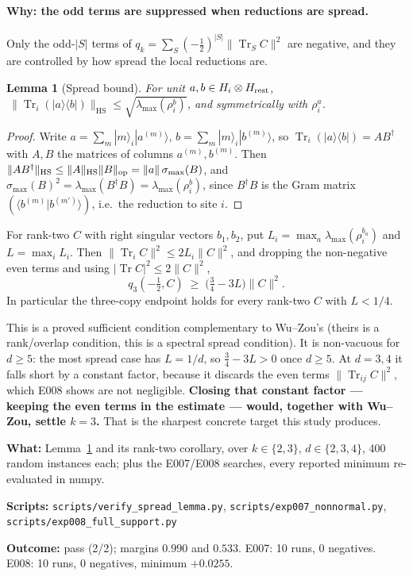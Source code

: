 \documentclass[11pt]{article}
\theoremstyle{definition}
\theoremstyle{plain}
\newtheorem{lemma}{Lemma}
\newcommand{\HS}{\mathrm{HS}}
\newcommand{\Tr}{\operatorname{Tr}}
\begin{document}
\paragraph{Why: the odd terms are suppressed when reductions are spread.} Only the
odd-$|S|$ terms of $q_k=\sum_S(-\tfrac12)^{|S|}\|\Tr_SC\|^2$ are negative, and they are
controlled by how spread the local reductions are.

\begin{lemma}[Spread bound]
\label{lem:spread}
For unit $a,b\in H_i\otimes H_{\rm rest}$,
$\ \|\Tr_i(|a\rangle\langle b|)\|_\HS\le\sqrt{\lambda_{\max}(\rho^b_i)}$, and symmetrically
with $\rho^a_i$.
\end{lemma}
\begin{proof}
Write $a=\sum_m|m\rangle_i|a^{(m)}\rangle$, $b=\sum_m|m\rangle_i|b^{(m)}\rangle$, so
$\Tr_i(|a\rangle\langle b|)=AB^\dagger$ with $A,B$ the matrices of columns $a^{(m)},b^{(m)}$.
Then $\|AB^\dagger\|_\HS\le\|A\|_\HS\|B\|_{\rm op}=\|a\|\,\sigma_{\max}(B)$, and
$\sigma_{\max}(B)^2=\lambda_{\max}(B^\dagger B)=\lambda_{\max}(\rho^b_i)$, since $B^\dagger B$
is the Gram matrix $(\langle b^{(m)}|b^{(m')}\rangle)$, i.e.\ the reduction to site $i$.
\end{proof}

\begin{corollary}
For rank-two $C$ with right singular vectors $b_1,b_2$, put
$L_i=\max_a\lambda_{\max}(\rho^{b_a}_i)$ and $L=\max_iL_i$. Then
$\|\Tr_iC\|^2\le2L_i\|C\|^2$, and dropping the non-negative even terms and using
$|\Tr C|^2\le2\|C\|^2$,
\[
q_3(-\tfrac12,C)\;\ge\;\Big(\tfrac34-3L\Big)\|C\|^2 .
\]
In particular the three-copy endpoint holds for every rank-two $C$ with $L<1/4$.
\end{corollary}

This is a proved sufficient condition complementary to Wu--Zou's (theirs is a rank/overlap
condition, this is a spectral spread condition). It is non-vacuous for $d\ge5$: the most
spread case has $L=1/d$, so $\tfrac34-3L>0$ once $d\ge5$. At $d=3,4$ it falls short by a
constant factor, because it discards the even terms $\|\Tr_{ij}C\|^2$, which E008 shows are
not negligible. \textbf{Closing that constant factor --- keeping the even terms in the
estimate --- would, together with Wu--Zou, settle $k=3$.} That is the sharpest concrete
target this study produces.

\begin{verification}
\textbf{What:} Lemma~\ref{lem:spread} and its rank-two corollary, over $k\in\{2,3\}$,
$d\in\{2,3,4\}$, 400 random instances each; plus the E007/E008 searches, every reported
minimum re-evaluated in numpy.

\textbf{Scripts:} \texttt{scripts/verify\_spread\_lemma.py},
\texttt{scripts/exp007\_nonnormal.py}, \texttt{scripts/exp008\_full\_support.py}

\textbf{Outcome:} pass (2/2); margins $0.990$ and $0.533$. E007: 10 runs, 0 negatives.
E008: 10 runs, 0 negatives, minimum $+0.0255$.
\end{verification}
\end{document}
